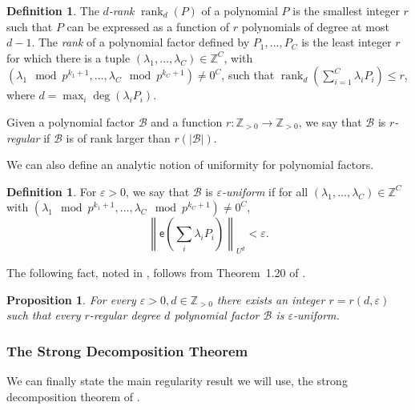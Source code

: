 \documentclass{article}
\theoremstyle{plain}
\newtheorem{prop}[theorem]{Proposition}
\theoremstyle{definition}
\theoremstyle{definition}
\newtheorem{defn}[theorem]{Definition}
\theoremstyle{remark}
\numberwithin{equation}{section}
\newcommand{\ZZ}{\mathbb{Z}}
\newcommand{\Z}{\mathbb{Z}}
\DeclareMathOperator{\rank}{rank}
\newcommand{\cB}{\mathcal B}
\newcommand{\expo}[1]{{\mathsf{e}\left(#1\right)}}
\begin{document}
\begin{defn}
The \emph{$d$-rank} $\rank_d(P)$ of a polynomial $P$ is the smallest integer $r$ such that $P$ can be expressed as a function of $r$ polynomials of degree at most $d-1$. The \emph{rank} of a polynomial factor defined by $P_1,\dots,P_C$ is the least integer $r$ for which there is a tuple $(\lambda_1,\dots,\lambda_C)\in\ZZ^C$, with $(\lambda_1 \mod p^{k_1+1}, \ldots, \lambda_C \mod p^{k_C+1})\neq 0^C$, such that $\rank_d(\sum_{i=1}^C \lambda_iP_i) \leq r$, where $d=\max_i \deg(\lambda_i P_i)$.

Given a polynomial factor $\cB$ and a function $r:\Z_{>0}\rightarrow \Z_{>0}$, we say that $\cB$ is \emph{$r$-regular} if $\cB$ is of rank larger than $r(|\cB|)$.
\end{defn}

We can also define an analytic notion of uniformity for polynomial factors.

\begin{defn}
For $\varepsilon>0$, we say that $\cB$ is \emph{$\varepsilon$-uniform} if for all $(\lambda_1,\dots,\lambda_C)\in\ZZ^C$ with $(\lambda_1 \mod p^{k_1+1}, \ldots, \lambda_C \mod p^{k_C+1})\neq 0^C$,
\[\left\|\expo{\sum_i \lambda_i P_i}\right\|_{U^d}<\varepsilon.\]
\end{defn}

The following fact, noted in \cite{hatamiRegCount}, follows from Theorem~1.20 of \cite{tao2012inverse}.

\begin{prop}\label{prop:regUni}
For every $\varepsilon>0,d\in\Z_{>0}$ there exists an integer $r=r(d,\varepsilon)$ such that every $r$-regular degree $d$ polynomial factor $\cB$ is $\varepsilon$-uniform.
\end{prop}

\subsubsection{The Strong Decomposition Theorem}
We can finally state the main regularity result we will use, the strong decomposition theorem of \cite{VeryCountingMaybe}.
\end{document}
